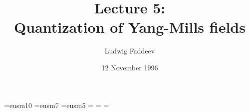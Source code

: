 
\font\teneusm=eusm10  \font\seveneusm=eusm7 
\font\fiveeusm=eusm5 
\newfam\eusmfam 
\textfont\eusmfam=\teneusm 
\scriptfont\eusmfam=\seveneusm 
\scriptscriptfont\eusmfam=\fiveeusm 
\def\Scr#1{{\fam\eusmfam\relax#1}}

\newcommand{\ScrA}{{\Scr A}} \newcommand{\ScrB}{{\Scr B}}
\newcommand{\ScrC}{{\Scr C}} \newcommand{\ScrD}{{\Scr D}}
\newcommand{\ScrE}{{\Scr E}} \newcommand{\ScrF}{{\Scr F}}
\newcommand{\ScrG}{{\Scr G}} \newcommand{\ScrH}{{\Scr H}}
\newcommand{\ScrI}{{\Scr I}} \newcommand{\ScrJ}{{\Scr J}}
\newcommand{\ScrK}{{\Scr K}} \newcommand{\ScrL}{{\Scr L}}
\newcommand{\ScrM}{{\Scr M}} \newcommand{\ScrN}{{\Scr N}}
\newcommand{\ScrO}{{\Scr O}} \newcommand{\ScrP}{{\Scr P}}
\newcommand{\ScrQ}{{\Scr Q}} \newcommand{\ScrR}{{\Scr R}}
\newcommand{\ScrS}{{\Scr S}} \newcommand{\ScrT}{{\Scr T}}
\newcommand{\ScrU}{{\Scr U}} \newcommand{\ScrV}{{\Scr V}}
\newcommand{\ScrW}{{\Scr W}} \newcommand{\ScrX}{{\Scr X}}
\newcommand{\ScrY}{{\Scr Y}} \newcommand{\ScrZ}{{\Scr Z}}


\newcommand{\grA}{{\frak A}}



\def\eps{\varepsilon}

\setlength{\textwidth}{6.5in}
\setlength{\textheight}{9.1in}
\setlength{\evensidemargin}{0in}
\setlength{\oddsidemargin}{0in}
\setlength{\topmargin}{-.75in}
\setlength{\parskip}{0.3\baselineskip}


\newcommand{\Le}{{{\mathchoice{\,{\scriptstyle\le}\,}
  {\,{\scriptstyle\le}\,}
  {\,{\scriptscriptstyle\le}\,}{\,{\scriptscriptstyle\le}\,}}}}
\newcommand{\Ge}{{{\mathchoice{\,{\scriptstyle\ge}\,}
  {\,{\scriptstyle\ge}\,}
  {\,{\scriptscriptstyle\ge}\,}{\,{\scriptscriptstyle\ge}\,}}}}




\nc{\bra}{  < }
\nc{\ket}{ > }
\nc{\triang}{ { \bigtriangleup} }

\nc{\hatastar}{{ \hat{\astar} }}



\title{Lecture 5:\\
Quantization of Yang-Mills fields}
\author{Ludwig Faddeev}
\date{12  November  1996}

